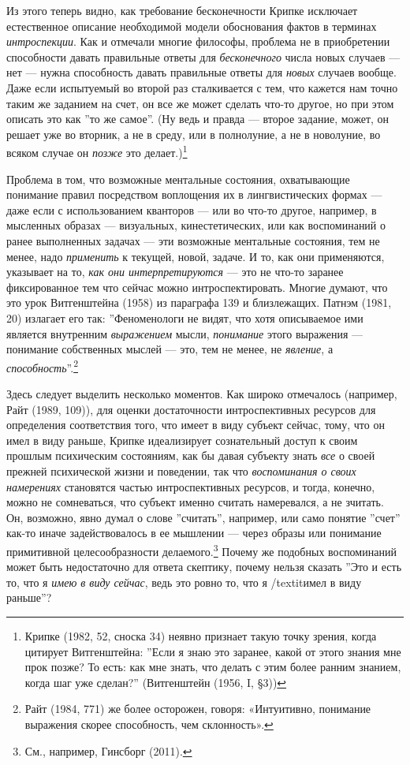 \documentclass[11pt]{book}
\begin{document}
Из этого теперь видно, как требование бесконечности Крипке исключает естественное описание необходимой модели обоснования фактов в терминах \textit{интроспекции}. Как и отмечали многие философы, проблема не в приобретении способности давать правильные ответы для \textit{бесконечного} числа новых случаев --- нет --- нужна способность давать правильные ответы для \textit{новых} случаев вообще. Даже если испытуемый во второй раз сталкивается с тем, что кажется нам точно таким же заданием на счет, он все же может сделать что-то другое, но при этом описать это как ''то же самое''. (Ну ведь и правда --- второе задание, может, он решает уже во вторник, а не в среду, или в полнолуние, а не в новолуние, во всяком случае он \textit{позже} это делает.)\footnote{Крипке (1982, 52, сноска 34) неявно признает такую точку зрения, когда цитирует Витгенштейна: ''Если я знаю это заранее, какой от этого знания мне прок позже? То есть: как мне знать, что делать с этим более ранним знанием, когда шаг уже сделан?'' (Витгенштейн (1956, I, §3))}

Проблема в том, что возможные ментальные состояния, охватывающие понимание правил посредством воплощения их в лингвистических формах --- даже если с использованием кванторов --- или во что-то другое, например, в мысленных образах --- визуальных, кинестетических, или как воспоминаний о ранее выполненных задачах --- эти возможные ментальные состояния, тем не менее, надо \textit{применить} к текущей, новой, задаче. И то, как они применяются, указывает на то, \textit{как они интерпретируются} --- это не что-то заранее фиксированное тем что сейчас можно интроспектировать. Многие думают, что это урок Витгенштейна (1958) из параграфа 139 и близлежащих. Патнэм (1981, 20) излагает его так: ''Феноменологи не видят, что хотя описываемое ими является внутренним \textit{выражением} мысли, \textit{понимание} этого выражения --- понимание собственных мыслей --- это, тем не менее, не \textit{явление}, а \textit{способность}''.\footnote{Райт (1984, 771) же более осторожен, говоря: «Интуитивно, понимание выражения скорее способность, чем склонность».}

Здесь следует выделить несколько моментов. Как широко отмечалось (например, Райт (1989, 109)), для оценки достаточности интроспективных ресурсов для определения соответствия того, что имеет в виду субъект сейчас, тому, что он имел в виду раньше, Крипке идеализирует сознательный доступ к своим прошлым психическим состояниям, как бы давая субъекту знать \textit{все} о своей прежней психической жизни и поведении, так что \textit{воспоминания о своих намерениях} становятся частью интроспективных ресурсов, и тогда, конечно, можно не сомневаться, что субъект именно считать намеревался, а не зчитать. Он, возможно, явно думал о слове ''считать'', например, или само понятие ''счет'' как-то иначе задействовалось в ее мышлении --- через образы или понимание примитивной целесообразности делаемого.\footnote{См., например, Гинсборг (2011).} Почему же подобных воспоминаний может быть недостаточно для ответа скептику, почему нельзя сказать ''Это и есть то, что я \textit{имею в виду сейчас}, ведь это ровно то, что я /textit{имел в виду раньше}''?
\end{document}
